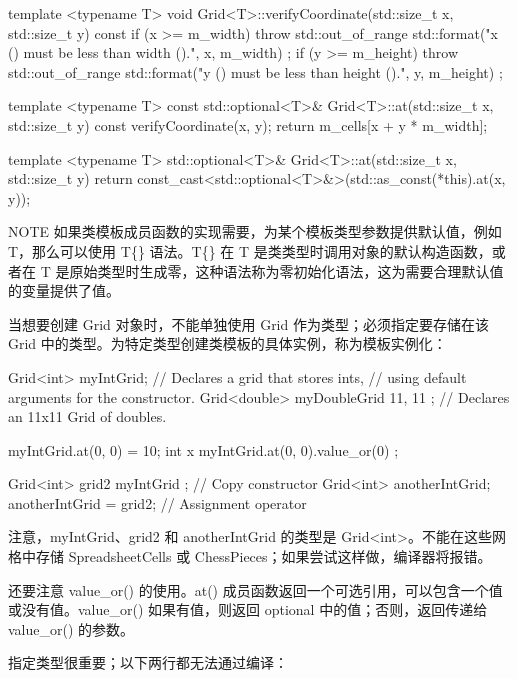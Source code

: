 \begin{cpp}
template <typename T>
void Grid<T>::verifyCoordinate(std::size_t x, std::size_t y) const
{
    if (x >= m_width) {
        throw std::out_of_range {
            std::format("x ({}) must be less than width ({}).", x, m_width) };
    }
    if (y >= m_height) {
        throw std::out_of_range {
            std::format("y ({}) must be less than height ({}).", y, m_height) };
    }
}

template <typename T>
const std::optional<T>& Grid<T>::at(std::size_t x, std::size_t y) const
{
    verifyCoordinate(x, y);
    return m_cells[x + y * m_width];
}

template <typename T>
std::optional<T>& Grid<T>::at(std::size_t x, std::size_t y)
{
    return const_cast<std::optional<T>&>(std::as_const(*this).at(x, y));
}
\end{cpp}

\begin{myNotic}{NOTE}
如果类模板成员函数的实现需要，为某个模板类型参数提供默认值，例如 T，那么可以使用 T\{\} 语法。T\{\} 在 T 是类类型时调用对象的默认构造函数，或者在 T 是原始类型时生成零，这种语法称为零初始化语法，这为需要合理默认值的变量提供了值。
\end{myNotic}


当想要创建 Grid 对象时，不能单独使用 Grid 作为类型；必须指定要存储在该 Grid 中的类型。为特定类型创建类模板的具体实例，称为模板实例化：

\begin{cpp}
Grid<int> myIntGrid; // Declares a grid that stores ints,
// using default arguments for the constructor.
Grid<double> myDoubleGrid { 11, 11 }; // Declares an 11x11 Grid of doubles.

myIntGrid.at(0, 0) = 10;
int x { myIntGrid.at(0, 0).value_or(0) };

Grid<int> grid2 { myIntGrid }; // Copy constructor
Grid<int> anotherIntGrid;
anotherIntGrid = grid2; // Assignment operator
\end{cpp}

注意，myIntGrid、grid2 和 anotherIntGrid 的类型是 Grid<int>。不能在这些网格中存储 SpreadsheetCells 或 ChessPieces；如果尝试这样做，编译器将报错。

还要注意 value\_or() 的使用。at() 成员函数返回一个可选引用，可以包含一个值或没有值。value\_or() 如果有值，则返回 optional 中的值；否则，返回传递给 value\_or() 的参数。

指定类型很重要；以下两行都无法通过编译：

